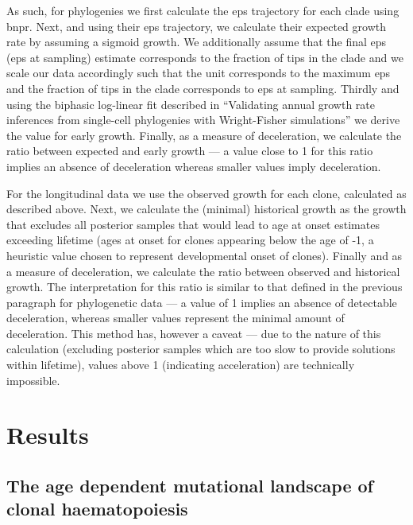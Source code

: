 As such, for phylogenies we first calculate the \ac{eps} trajectory for each clade using \ac{bnpr}. Next, and using their \ac{eps} trajectory, we calculate their expected growth rate by assuming a sigmoid growth. We additionally assume that the final \ac{eps} (\ac{eps} at sampling) estimate corresponds to the fraction of tips in the clade and we scale our data accordingly such that the unit corresponds to the maximum \ac{eps} and the fraction of tips in the clade corresponds to \ac{eps} at sampling. Thirdly and using the biphasic log-linear fit described in “Validating annual growth rate inferences from single-cell phylogenies with Wright-Fisher simulations” we derive the value for early growth. Finally, as a measure of deceleration, we calculate the ratio between expected and early growth --- a value close to 1 for this ratio implies an absence of deceleration whereas smaller values imply deceleration. 

For the longitudinal data we use the observed growth for each clone, calculated as described above. Next, we calculate the (minimal) historical growth as the growth that excludes all posterior samples that would lead to age at onset estimates exceeding lifetime (ages at onset for clones appearing below the age of -1, a heuristic value chosen to represent developmental onset of clones). Finally and as a measure of deceleration, we calculate the ratio between observed and historical growth. The interpretation for this ratio is similar to that defined in the previous paragraph for phylogenetic data --- a value of 1 implies an absence of detectable deceleration, whereas smaller values represent the minimal amount of deceleration. This method has, however a caveat --- due to the nature of this calculation (excluding posterior samples which are too slow to provide solutions within lifetime), values above 1 (indicating acceleration) are technically impossible. 

\section{Results}

\subsection{The age dependent mutational landscape of clonal haematopoiesis}

